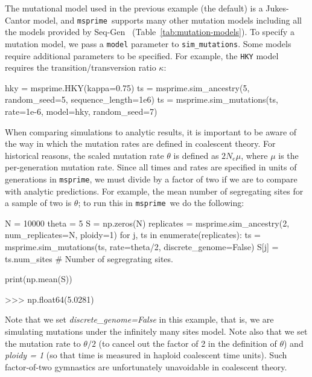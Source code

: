 \documentclass[graybox]{svmult}
\newcommand{\msprime}[0]{\texttt{msprime}}
\begin{document}
The mutational model used in the previous example (the
default) is a Jukes-Cantor model, and
\msprime\ supports many other mutation models
including all the models provided by
Seq-Gen~\citep{rambaut1997seq}
(Table~\ref{tab:mutation-models}).
To specify a mutation model, we pass a \texttt{model} parameter to \texttt{sim\_mutations}.
Some models
require additional parameters to be specified.
For example, the \texttt{HKY} model requires the transition/transversion
ratio $\kappa$:

\begin{pythoncode}
hky = msprime.HKY(kappa=0.75)
ts = msprime.sim_ancestry(5, random_seed=5, sequence_length=1e6)
ts = msprime.sim_mutations(ts, rate=1e-6, model=hky, random_seed=7)
\end{pythoncode}

When comparing simulations to analytic results, it is important to be aware of the way in which the
mutation rates are defined in coalescent theory. For historical reasons,
the scaled mutation rate \(\theta\) is defined as \(2N_e \mu\), where
\(\mu\) is the per-generation mutation rate. Since all times and rates
are specified in units of generations in \msprime, we must divide by a
factor of two if we are to compare with analytic predictions. For
example, the mean number of segregating sites for a sample of two is
\(\theta\); to run this in \msprime\ we do the following:

\begin{pythoncode}
N = 10000
theta = 5
S = np.zeros(N)
replicates = msprime.sim_ancestry(2, num_replicates=N, ploidy=1)
for j, ts in enumerate(replicates):
    ts = msprime.sim_mutations(ts, rate=theta/2,
        discrete_genome=False)
    S[j] = ts.num_sites  # Number of segregrating sites.

print(np.mean(S))

>>> np.float64(5.0281)

\end{pythoncode}

Note that we set \emph{discrete\_genome=False} in this example, that is,
we are simulating mutations under the infinitely many sites model.
Note also that we set the mutation rate to \(\theta / 2\) (to cancel out
the factor of 2 in the definition of \(\theta\)) and \emph{ploidy = 1} (so
that time is measured in haploid coalescent time units).
Such factor-of-two gymnastics are unfortunately unavoidable in coalescent
theory.
\end{document}

